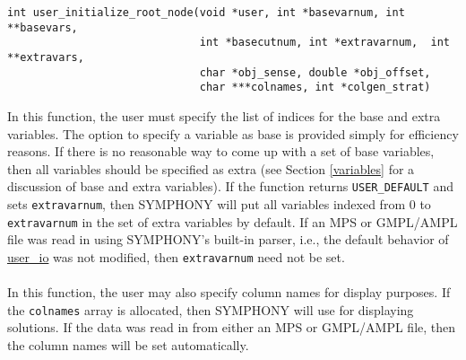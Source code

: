 \ed

\vspace{1ex}


\label{user_initialize_root_node}
\begin{verbatim}
int user_initialize_root_node(void *user, int *basevarnum, int **basevars,
                              int *basecutnum, int *extravarnum,  int **extravars,
                              char *obj_sense, double *obj_offset,
                              char ***colnames, int *colgen_strat)
\end{verbatim}

\bd

\describe

In this function, the user must specify the list of indices for the base and
extra variables. The option to specify a variable as base is provided simply
for efficiency reasons. If there is no reasonable way to come up with a set of
base variables, then all variables should be specified as extra (see Section
\ref{variables} for a discussion of base and extra variables). If the function
returns \texttt{USER\_DEFAULT} and sets \texttt{extravarnum}, then SYMPHONY
will put all variables indexed from 0 to \texttt{extravarnum} in the set of
extra variables by default. If an MPS or GMPL/AMPL file was read in using
SYMPHONY's built-in parser, i.e., the default behavior of
\hyperref{\texttt{user\_io}}{\texttt{user\_io()}}{}{user_io} was not modified,
then \texttt{extravarnum} need not be set. \\
\\
In this function, the user may also specify column names for display
purposes. If the \texttt{colnames} array is allocated, then SYMPHONY will use
for displaying solutions. If the data was read in from either an MPS or
GMPL/AMPL file, then the column names will be set automatically.

\args

